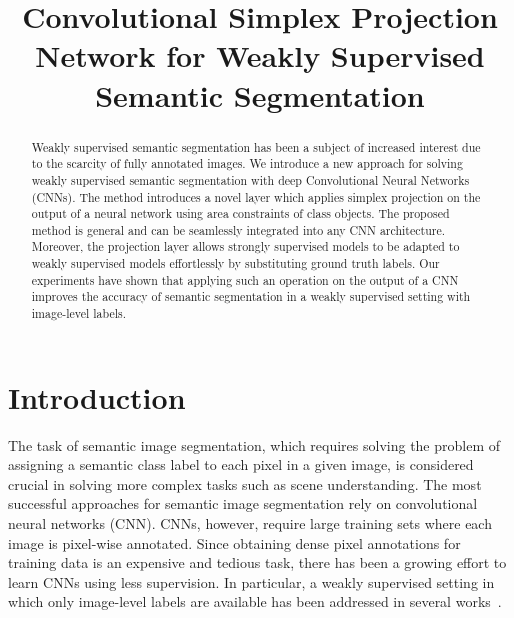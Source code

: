 \documentclass{bmvc2k}
\title{Convolutional Simplex Projection Network for Weakly Supervised Semantic Segmentation}
\begin{document}
	
	\maketitle
	
	\begin{abstract}
Weakly supervised semantic segmentation has been a subject of increased interest due to the scarcity of fully annotated images.
We introduce a new approach for solving weakly supervised semantic segmentation with deep Convolutional Neural Networks (CNNs). The method introduces a novel layer which applies simplex projection on the output of a neural network using area constraints of class objects. The proposed method is general and can be seamlessly integrated into any CNN architecture. Moreover, the projection layer allows strongly supervised models to be adapted to weakly supervised models effortlessly by substituting ground truth labels. Our experiments have shown that applying such an operation on the output of a CNN improves the accuracy of semantic segmentation in a weakly supervised setting with image-level labels.
		
	\end{abstract}
	
	\section{Introduction}
	\label{sec:intro}
	
The task of semantic image segmentation, which requires solving the problem of assigning a semantic class label to each pixel in a given image, is considered crucial in solving more complex tasks such as scene understanding. The most successful approaches for semantic image segmentation rely on convolutional neural networks (CNN). CNNs, however, require large training sets where each image is pixel-wise annotated. Since obtaining dense pixel annotations for training data is an expensive and tedious task, there has been a growing effort to learn CNNs using less supervision. In particular, a weakly supervised setting in which only image-level labels are available has been addressed in several works~\citep{papandreou2015weakly, Shimoda2016DistinctCS, kolesnikov2016seed, zhang2018decoupled, chaudhry2017discovering}. 
\end{document}
